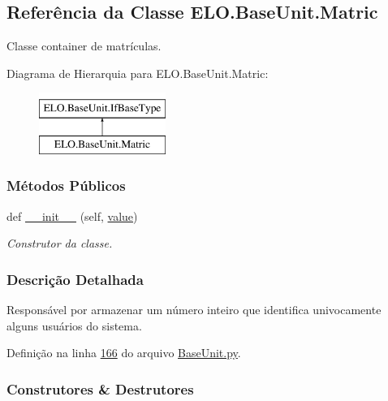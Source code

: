 \hypertarget{classELO_1_1BaseUnit_1_1Matric}{}\subsection{Referência da Classe E\+L\+O.\+Base\+Unit.\+Matric}
\label{classELO_1_1BaseUnit_1_1Matric}


Classe container de matrículas.  


Diagrama de Hierarquia para E\+L\+O.\+Base\+Unit.\+Matric\+:\begin{figure}[H]
\begin{center}
\leavevmode
\includegraphics[height=2.000000cm]{d6/db2/classELO_1_1BaseUnit_1_1Matric}
\end{center}
\end{figure}
\subsubsection*{Métodos Públicos}
\begin{DoxyCompactItemize}
\item 
def \hyperlink{classELO_1_1BaseUnit_1_1Matric_afc0a80bb206f5c6259901d9b817ec751}{\+\_\+\+\_\+init\+\_\+\+\_\+} (self, \hyperlink{classELO_1_1BaseUnit_1_1IfBaseType_a2534c3548a8e5991dde0a64b4f0b542b}{value})
\begin{DoxyCompactList}\small\item\em Construtor da classe. \end{DoxyCompactList}\end{DoxyCompactItemize}


\subsubsection{Descrição Detalhada}
Responsável por armazenar um número inteiro que identifica univocamente alguns usuários do sistema. 

Definição na linha \hyperlink{BaseUnit_8py_source_l00166}{166} do arquivo \hyperlink{BaseUnit_8py_source}{Base\+Unit.\+py}.



\subsubsection{Construtores \& Destrutores}
\hypertarget{classELO_1_1BaseUnit_1_1Matric_afc0a80bb206f5c6259901d9b817ec751}{}
